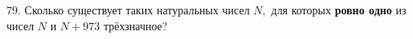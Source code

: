 79. Сколько существует таких натуральных чисел $N,$ для которых {\bf ровно одно} из чисел $N$ и $N+973$ трёхзначное?\\
